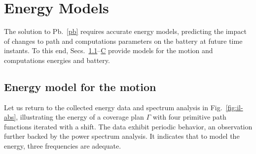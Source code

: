 \documentclass[letterpaper,10pt,journal,twoside]{IEEEtran}
\theoremstyle{definition}
\newtheorem{defn}{Definition}[section]
\newtheorem{pb}{Problem}[section]
\begin{document}




\vspace*{-1ex}
\section{Energy Models}  %
\label{sec:energy-model} %
The solution to Pb.~\ref{pb} requires accurate energy models, predicting the impact of changes to path and computations parameters on the battery at future time instants. To this end, Secs.~\ref{sec:mod-mot}--\hyperref[sec:mod-bat]{C} provide models for the motion and computations energies and battery.

\vspace*{-2ex}
\subsection{Energy model for the motion}
\label{sec:mod-mot}

Let us return to the collected energy data and spectrum analysis in Fig.~\ref{fig:il-abs}, illustrating the energy of a coverage plan $\Gamma$ with four primitive path functions iterated with a shift. The data exhibit periodic behavior, an observation further backed by the power spectrum analysis. It indicates that to model the energy, three frequencies are adequate.
\end{document}
